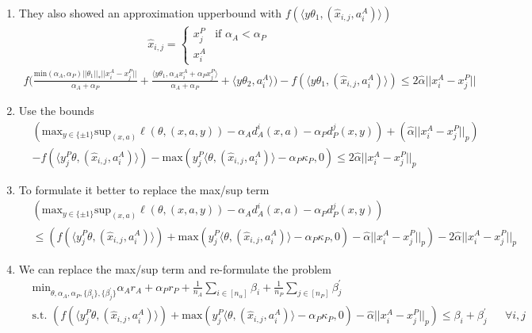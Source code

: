 \documentclass{article}
\begin{document}
\begin{enumerate}
        \item They also showed an approximation upperbound with $f(\langle y \theta_{1},(\hat{x}_{i,j},a_{i}^{A}) \rangle )$
        \begin{align*}
            \hat{x}_{i, j} = \begin{cases} x_j^P &\text{if } \alpha_A < \alpha_P \\ x_i^A \end{cases}
        \end{align*}
        \begin{align*}
            f\Biggl(\frac{\mathrm{min}(\alpha_{A},\alpha_P)||\theta_{1}||_* ||x_{i}^{A}-x_{j}^{P}||}{\alpha_{A}+\alpha_{P}}+\frac{\langle y\theta_{1},\alpha_{A}x_{i}^{A}+\alpha_P x_{j}^{P}\rangle}{\alpha_{A}+\alpha_{P}}+\langle y\theta_{2},a_{i}^{A}\rangle\Biggr) - f(\langle y \theta_{1},(\hat{x}_{i,j},a_{i}^{A}) \rangle ) \le 2 \hat{\alpha} ||x_i^{A} - x_j^{P}||
        \end{align*}

        \item Use the bounds
        \begin{align*}
            &\left(\mathrm{max}_{y\in \{\pm 1\} } \mathrm{sup}_{(x, a)} \ell(\theta,(x,a,y))-\alpha_{A}d_{A}^{i}(x,a)-\alpha_{P} d_{P}^{j}(x,y)\right) + \left( \hat{\alpha} ||x_i^A - x_j^P||_p \right)
            \\ &- f(\langle y_j^P \theta, (\hat{x}_{i,j}, a_i^A) \rangle) - \text{max}(y_j^P \langle \theta, (\hat{x}_{i,j}, a_i^A) \rangle - \alpha_P \kappa_P, 0) \le 2 \hat{\alpha} ||x_i^A - x_j^P||_p
        \end{align*}
        
        \item To formulate it better to replace the max/sup term
        \begin{align*}
            &\left(\mathrm{max}_{y\in \{\pm 1\} } \mathrm{sup}_{(x, a)} \ell(\theta,(x,a,y))-\alpha_{A}d_{A}^{i}(x,a)-\alpha_{P} d_{P}^{j}(x,y)\right)
            \\ &\le \left( f(\langle y_j^P \theta, (\hat{x}_{i,j}, a_i^A) \rangle) + \text{max}(y_j^P \langle \theta, (\hat{x}_{i,j}, a_i^A) \rangle - \alpha_P \kappa_P, 0) - \hat{\alpha} ||x_i^A - x_j^P||_p \right) - 2 \hat{\alpha} ||x_i^A - x_j^P||_p
        \end{align*}

        \item We can replace the max/sup term and re-formulate the problem
        \begin{align*}
            &\mathrm{min}_{\theta, \alpha_{A}, \alpha_{P}, \{\beta_i \}, \{\beta_j^\prime \}} \alpha_A r_A + \alpha_P r_P + \frac{1}{n_A} \sum_{i \in [n_\alpha]} \beta_i + \frac{1}{n_P} \sum_{j \in [n_P]} \beta_j^\prime
            \\ &\text{s.t. } \left( f(\langle y_j^P \theta, (\hat{x}_{i,j}, a_i^A) \rangle) + \text{max}(y_j^P \langle \theta, (\hat{x}_{i,j}, a_i^A) \rangle - \alpha_P \kappa_P, 0) - \hat{\alpha} ||x_i^A - x_j^P||_p \right) \le \beta_i + \beta_j^\prime &&\forall i, j
        \end{align*}
    \end{enumerate}
\end{document}
